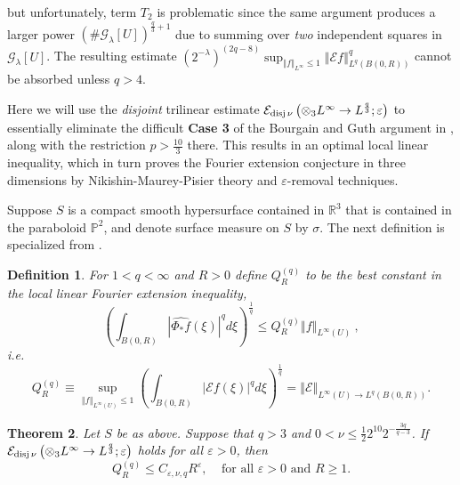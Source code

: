 \documentclass{amsart}%
\newtheorem{theorem}{Theorem}
\theoremstyle{plain}
\newtheorem{definition}[theorem]{Definition}
\numberwithin{equation}{section}
\begin{document}
but unfortunately, term $T_{2}$ is problematic since the same argument
produces a larger power $\left(  \#\mathcal{G}_{\lambda}\left[  U\right]
\right)  ^{\frac{q}{3}+1}$ due to summing over \emph{two} independent squares
in $\mathcal{G}_{\lambda}\left[  U\right]  $. The resulting estimate $\left(
2^{-\lambda}\right)  ^{\left(  2q-8\right)  }\sup_{\left\Vert f\right\Vert
_{L^{\infty}}\leq1}\left\Vert \mathcal{E}f\right\Vert _{L^{q}\left(  B\left(
0,R\right)  \right)  }^{q}$ cannot be absorbed unless $q>4$.

Here we will use the \emph{disjoint} trilinear estimate $\mathcal{E}%
_{\mathop{\rm disj}\nu}\left(  \otimes_{3}L^{\infty}\rightarrow L^{\frac{q}%
{3}};\varepsilon\right)  $ to essentially eliminate the difficult \textbf{Case
3} of the Bourgain and Guth argument in \cite[Section 2]{BoGu}, along with the
restriction $p>\frac{10}{3}$ there. This results in an optimal local linear
inequality, which in turn proves the Fourier extension conjecture in three
dimensions by Nikishin-Maurey-Pisier theory and $\varepsilon$-removal techniques.

Suppose $S$ is a compact smooth hypersurface contained in $\mathbb{R}^{3}$
that is contained in the paraboloid $\mathbb{P}^{2}$, and denote surface
measure on $S$ by $\sigma$. The next definition is specialized from
\cite{BoGu}.

\begin{definition}
For $1<q<\infty$ and $R>0$ define $Q_{R}^{\left(  q\right)  }$ to be the best
constant in the local linear Fourier extension inequality,%
\[
\left(  \int_{B\left(  0,R\right)  }\left\vert \widehat{\Phi_{\ast}f}\left(
\xi\right)  \right\vert ^{q}d\xi\right)  ^{\frac{1}{q}}\leq Q_{R}^{\left(
q\right)  }\left\Vert f\right\Vert _{L^{\infty}\left(  U\right)  }\ ,
\]
i.e.
\begin{equation}
Q_{R}^{\left(  q\right)  }\equiv\sup_{\left\Vert f\right\Vert _{L^{\infty
}\left(  U\right)  }\leq1}\left(  \int_{B\left(  0,R\right)  }\left\vert
\mathcal{E}f\left(  \xi\right)  \right\vert ^{q}d\xi\right)  ^{\frac{1}{q}%
}=\left\Vert \mathcal{E}\right\Vert _{L^{\infty}\left(  U\right)  \rightarrow
L^{q}\left(  B\left(  0,R\right)  \right)  }.\label{Q_R}%
\end{equation}

\end{definition}

\begin{theorem}
\label{Loc lin}Let $S$ be as above. Suppose that $q>3$ and $0<\nu\leq\frac
{1}{2}2^{10}2^{-\frac{3q}{q-3}}$. If $\mathcal{E}_{\mathop{\rm disj}\nu
}\left(  \otimes_{3}L^{\infty}\rightarrow L^{\frac{q}{3}};\varepsilon\right)
$ holds for all $\varepsilon>0$, then%
\[
Q_{R}^{\left(  q\right)  }\leq C_{\varepsilon,\nu,q}R^{\varepsilon
},\ \ \ \ \ \text{for all }\varepsilon>0\text{ and }R\geq1.
\]

\end{theorem}
\end{document}
